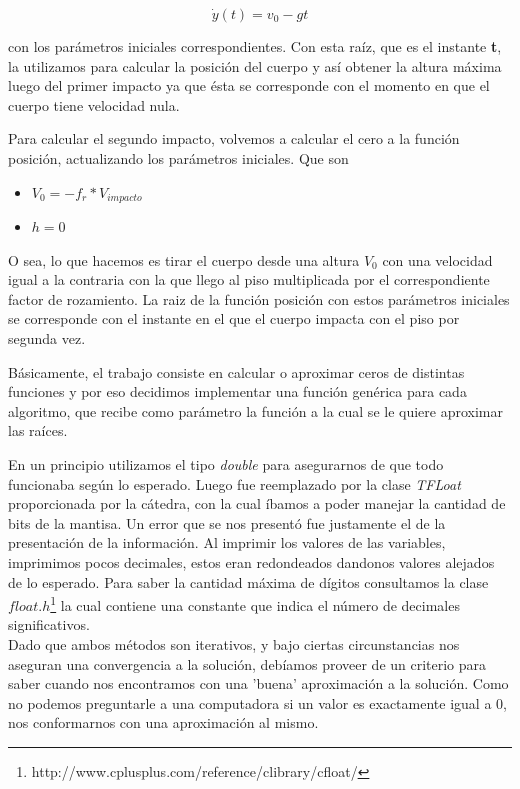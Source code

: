 \documentclass[a4paper]{article}
\begin{document}
\begin{equation}
 \dot{y}(t) = v_0 - g t
\end{equation}

con los parámetros iniciales correspondientes. Con esta raíz, que es el instante \textbf{t}, la utilizamos para calcular la posición del cuerpo y así obtener la altura máxima luego del primer impacto ya que ésta se corresponde con el momento en que el cuerpo tiene velocidad nula.\\ \hspace{1em}

Para calcular el segundo impacto, volvemos a calcular el cero a la función posición,  actualizando los parámetros iniciales. Que son 

\begin{itemize}
 	\item $V_0 = -f_r *V_{impacto} $
	\item $h = 0$ 
\end{itemize}

O sea, lo que hacemos es tirar el cuerpo desde una altura $V_0$ con una velocidad igual a la contraria con la que llego al piso multiplicada por el correspondiente factor de rozamiento. La raiz de la función posición con estos parámetros iniciales se corresponde con el instante en el que el cuerpo impacta con el piso por segunda vez.

\hspace{1em}

Básicamente, el trabajo consiste en calcular o aproximar ceros de distintas funciones y por eso decidimos implementar una función genérica para cada algoritmo, que recibe como parámetro la función a la cual se le quiere aproximar las raíces. 

En un principio utilizamos el tipo \textit{double} para asegurarnos de que todo funcionaba según lo esperado. Luego fue reemplazado por la clase \textit{TFLoat} proporcionada por la cátedra, con la cual íbamos a poder manejar la cantidad de bits de la mantisa.   
Un error que se nos presentó fue justamente el de la presentación de la información. Al imprimir los valores de las variables, imprimimos pocos decimales, estos eran redondeados dandonos valores alejados de lo esperado. Para saber la cantidad máxima de dígitos consultamos la clase $float.h$\footnote{http://www.cplusplus.com/reference/clibrary/cfloat/} la cual contiene una constante que indica el número de decimales significativos. \\[1em]

Dado que ambos métodos son iterativos, y bajo ciertas circunstancias nos aseguran una convergencia a la solución, debíamos proveer de un criterio para saber cuando nos encontramos con una 'buena' aproximación a la solución. Como no podemos preguntarle a una computadora si un valor es exactamente igual a 0, nos conformarnos con una aproximación al mismo.
\end{document}
